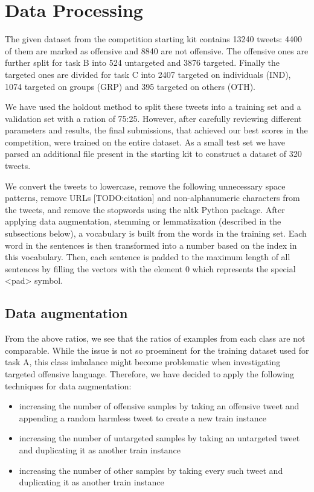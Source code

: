 \documentclass[11pt,a4paper]{article}
\begin{document}

\section{Data Processing}


The given dataset from the competition starting kit contains 13240 tweets: 4400 of them are marked as offensive and 8840 are not offensive. The offensive ones are further split for task B into 524 untargeted and 3876 targeted. Finally the targeted ones are divided for task C into 2407 targeted on individuals (IND), 1074 targeted on groups (GRP) and 395 targeted on others (OTH).

We have used the holdout method to split these tweets into a training set and a validation set with a ration of 75:25. However, after carefully reviewing different parameters and results, the final submissions, that achieved our best scores in the competition, were trained on the entire dataset. As a small test set we have parsed an additional file present in the starting kit to construct a dataset of 320 tweets.

We convert the tweets to lowercase, remove the following unnecessary space patterns, remove URLs [TODO:citation] and non-alphanumeric characters from the tweets, and remove the stopwords using the nltk Python package. After applying data augmentation, stemming or lemmatization (described in the subsections below), a vocabulary is built from the words in the training set. Each word in the sentences is then transformed into a number based on the index in this vocabulary. Then, each sentence is padded to the maximum length of all sentences by filling the vectors with the element 0 which represents the special <pad> symbol.

\subsection{Data augmentation}

From the above ratios, we see that the ratios of examples from each class are not comparable. While the issue is not so proeminent for the training dataset used for task A, this class imbalance might become problematic when investigating targeted offensive language. Therefore, we have decided to apply the following techniques for data augmentation:
\begin{itemize}
    \item increasing the number of offensive samples by taking an offensive tweet and appending a random harmless tweet to create a new train instance
    \item increasing the number of untargeted samples by taking an untargeted tweet and duplicating it as another train instance
    \item increasing the number of other samples by taking every such tweet and duplicating it as another train instance
\end{itemize}
\end{document}
